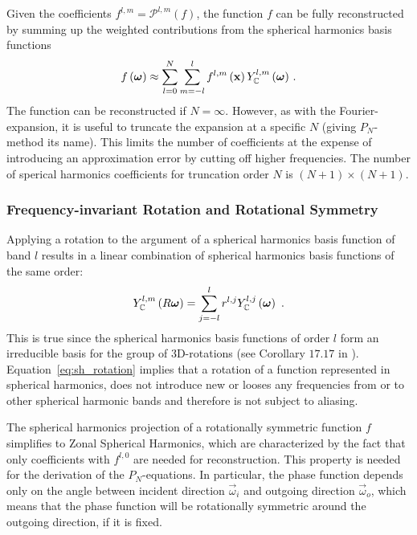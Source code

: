 Given the coefficients $f^{l, m} = \mathcal{P}^{l, m}(f)$, the function $f$ can be fully reconstructed by summing up the weighted contributions from the spherical harmonics basis functions
\begin{align}
\label{eq:sh_reconstruction}
f\left(\boldsymbol{\mathbf{\omega}}\right) \approx 
\sum_{l=0}^{N}
{
\sum_{m=-l}^{l}
{
f^{l,m}\left(\boldsymbol{\mathbf{x}}\right)Y_{\mathbb{C}}^{l,m}\left(\boldsymbol{\mathbf{\omega}}\right)
}
}
\ .
\end{align}
The function can be reconstructed if $N=\infty$. However, as with the Fourier-expansion, it is useful to truncate the expansion at a specific $N$ (giving $P_N$-method its name). This limits the number of coefficients at the expense of introducing an approximation error by cutting off higher frequencies. The number of sperical harmonics coefficients for truncation order $N$ is $(N+1)\times(N+1)$.

\subsubsection*{Frequency-invariant Rotation and Rotational Symmetry}

Applying a rotation to the argument of a spherical harmonics basis function of band $l$ results in a linear combination of spherical harmonics basis functions of the same order:
\begin{align}
\label{eq:sh_rotation}
Y_{\mathbb{C}}^{l,m}\left(R\boldsymbol{\mathbf{\omega}}\right)=\sum_{j=-l}^{l}r^{l,j}Y_{\mathbb{C}}^{l,j}\left(\boldsymbol{\mathbf{\omega}}\right)
\ .
\end{align}
This is true since the spherical harmonics basis functions of order $l$ form an irreducible basis for the group of 3D-rotations (see Corollary $17.17$ in \cite{Hall13}). Equation~\ref{eq:sh_rotation} implies that a rotation of a function represented in spherical harmonics, does not introduce new or looses any frequencies from or to other spherical harmonic bands and therefore is not subject to aliasing.

The spherical harmonics projection of a rotationally symmetric function $f$ simplifies to Zonal Spherical Harmonics, which are characterized by the fact that only coefficients with $f^{l,0}$ are needed for reconstruction. This property is needed for the derivation of the $P_N$-equations. In particular, the phase function depends only on the angle between incident direction $\vec{\omega}_i$ and outgoing direction $\vec{\omega}_o$, which means that the phase function will be rotationally symmetric around the outgoing direction, if it is fixed. 

